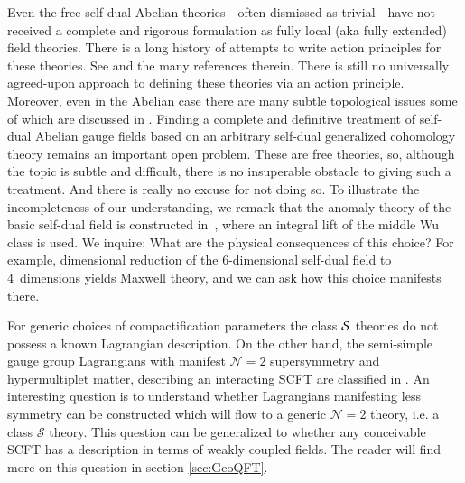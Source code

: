 \documentclass[12pt]{article}
\newcommand{\comments}[1]{{\color{magenta}  #1}}
\newcommand\CalN{\mathcal{N}}
\newcommand\CalS{\mathcal{S}}
\begin{document}
Even the free self-dual Abelian theories - often dismissed as trivial - have not received a complete
and rigorous formulation as fully local (aka fully extended) field theories.
There is a long history of attempts to write action principles for 
these theories. 
See 
\cite{Andriolo:2020ykk,Andriolo:2021gen,Belov:2006jd,Belov:2006xj,
Sen:2019qit} and the many references therein. There is still no 
universally agreed-upon approach to defining these theories via an 
action principle. Moreover, even in the   Abelian case there are many subtle topological issues some of which 
 are discussed in \cite{Alvarez-Gaume:1987wwg,Alvarez-Gaume:1986nqf,
 Belov:2006jd,Belov:2006xj,Freed:2006yc,Freed:2006ya,
 Hopkins:2002rd,Hsieh:2020jpj,Witten:1996hc}.
 Finding a complete and definitive treatment of self-dual Abelian gauge fields based on an arbitrary self-dual generalized cohomology
theory remains an important open problem. These are free theories, so, although the topic is subtle and difficult,
there is no insuperable obstacle to giving such a treatment. And there is really no excuse for not doing so. 
To illustrate the incompleteness of our understanding, we remark that the anomaly theory of the basic self-dual field is constructed in~\cite{Hopkins:2002rd}, where an integral lift of the middle Wu class is used.  We inquire: What are the physical consequences of this choice?  For example, dimensional reduction of the 6-dimensional self-dual field to 4~dimensions yields Maxwell theory, and we can ask how this choice manifests there.
%
%
%

 For generic choices of compactification parameters the class ${\cal S}$ theories \cite{Gaiotto:2009we,Gaiotto:2009hg,Klemm:1996bj,Witten:1997sc} do not possess a known Lagrangian description. On the other hand, the semi-simple gauge group Lagrangians with manifest ${\CalN}=2$ supersymmetry and hypermultiplet matter, describing an interacting SCFT are classified in \cite{Bhardwaj:2013qia}.
 An interesting question is to understand whether Lagrangians manifesting less symmetry can be constructed which will flow to a generic ${\CalN}=2$ theory, i.e. a class $\CalS$ theory. This question can be generalized to whether any conceivable SCFT has a description in terms of weakly coupled fields. The reader will find more on this question in section \ref{sec:GeoQFT}.
\end{document}
